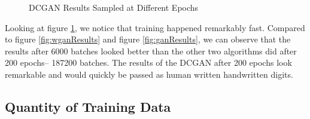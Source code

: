 \documentclass[12pt,
 reprint,
nofootinbib,
 amsmath,amssymb,
 aps,
floatfix,
]{revtex4-2}
\begin{document}
\begin{figure}[h!]
    \centering
    \qquad
    \qquad
    \caption{DCGAN Results Sampled at Different Epochs}%
    \label{fig:dcganResults}%
\end{figure}


Looking at figure \ref{fig:dcganResults}, we notice that training happened remarkably fast. Compared to figure \ref{fig:wganResults} and figure \ref{fig:ganResults}, we can observe that the results after 6000 batches looked better than the other two algorithms did after 200 epochs-- 187200 batches. The results of the DCGAN after 200 epochs look remarkable and would quickly be passed as human written handwritten digits. 


\subsection{\label{sec:expData}Quantity of Training Data}
\end{document}
